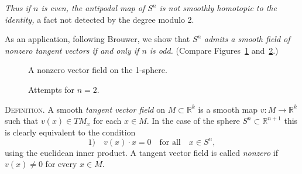 \emph{Thus if $n$ is even, the antipodal map of $S^n$ is not smoothly homotopic to the identity,} a fact not detected by the degree modulo 2.

As an application, following Brouwer, we show that $S^n$ \emph{admits a smooth field of nonzero tangent vectors if and only if $n$ is odd.} (Compare Figures~\ref{fig:milnor-10} and~\ref{fig:milnor-11}.)

\begin{figure}[htbp]
\centering
\setcounter{figure}{9}%
\caption{A nonzero vector field on the 1-sphere.}\label{fig:milnor-10}
\end{figure}

\begin{figure}[htbp]
\centering
\setcounter{figure}{10}%
\caption{Attempts for $n = 2$.}\label{fig:milnor-11}
\end{figure}

\textsc{Definition.} A smooth \emph{tangent vector field} on $M \subset \mathbb{R}^k$ is a smooth map $v : M \to \mathbb{R}^k$ such that $v(x) \in TM_x$ for each $x \in M$. In the case of the sphere $S^n \subset \mathbb{R}^{n+1}$ this is clearly equivalent to the condition
\[
\text{1)} \quad v(x) \cdot x = 0 \quad \text{for all} \quad x \in S^n,
\]
using the euclidean inner product. A tangent vector field is called \emph{nonzero} if $v(x) \neq 0$ for every $x \in M$.

